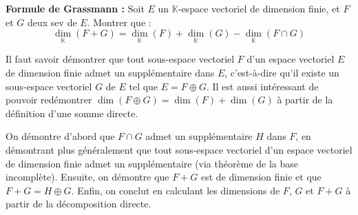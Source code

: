 \documentclass[11pt, a4paper]{article}
\theoremstyle{definition}
\begin{document}
\clearpage

\begin{tcolorbox}[instructionstyle]
	\textbf{Formule de Grassmann :} Soit $E$ un $\mathbb{K}$-espace vectoriel de dimension finie, et $F$ et $G$ deux sev de $E$. Montrer que :
	\[\underset{\mathbb{K}}{\dim}(F + G) = \underset{\mathbb{K}}{\dim}(F) + \underset{\mathbb{K}}{\dim}(G) - \underset{\mathbb{K}}{\dim}(F \cap G)\]
\end{tcolorbox}

\begin{rappel}
	Il faut savoir démontrer que tout sous-espace vectoriel $F$ d'un espace vectoriel $E$ de dimension finie admet un supplémentaire dans $E$, c'est-à-dire qu'il existe un sous-espace vectoriel $G$ de $E$ tel que $E = F \oplus G$. Il est aussi intéressant de pouvoir redémontrer $\dim(F \oplus G) = \dim(F) + \dim(G)$ à partir de la définition d'une somme directe.
\end{rappel}

\begin{tcolorbox}[methodstyle]
	On démontre d'abord que $F \cap G$ admet un supplémentaire $H$ dans $F$, en démontrant plus généralement que tout sous-espace vectoriel d'un espace vectoriel de dimension finie admet un supplémentaire (via théorème de la base incomplète). Ensuite, on démontre que $F+G$ est de dimension finie et que $F+G = H \oplus G$. Enfin, on conclut en calculant les dimensions de $F$, $G$ et $F+G$ à partir de la décomposition directe.
\end{tcolorbox}
\end{document}
